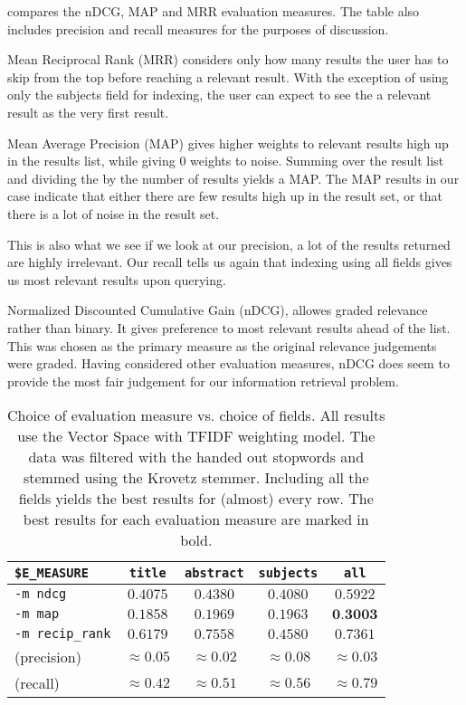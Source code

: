  compares the nDCG, MAP and MRR
evaluation measures.  The table also includes precision and recall measures for
the purposes of discussion.

Mean Reciprocal Rank (MRR) considers only how many results the user has to skip
from the top before reaching a relevant result. With the exception of using
only the subjects field for indexing, the user can expect to see the a relevant
result as the very first result.

Mean Average Precision (MAP) gives higher weights to relevant results high up
in the results list, while giving 0 weights to noise. Summing over the result
list and dividing the by the number of results yields a MAP. The MAP results in
our case indicate that either there are few results high up in the result set,
or that there is a lot of noise in the result set.

This is also what we see if we look at our precision, a lot of the results
returned are highly irrelevant. Our recall tells us again that indexing using
all fields gives us most relevant results upon querying.

Normalized Discounted Cumulative Gain (nDCG), allowes graded relevance rather
than binary. It gives preference to most relevant results ahead of the list.
This was chosen as the primary measure as the original relevance judgements
were graded. Having considered other evaluation measures, nDCG does seem to
provide the most fair judgement for our information retrieval problem.

\begin{table}[h!]
\centering
\begin{tabular}{lcccc}
\lstinline|$E_MEASURE| & \lstinline$title$ & \lstinline$abstract$ &
    \lstinline$subjects$ & \lstinline$all$ \\
\hline
\lstinline$-m ndcg$ & $0.4075$ & $0.4380$ & $0.4080$ & $\mathbf{0.5922}$ \\
\lstinline$-m map$ & $0.1858$ & $0.1969$ & $0.1963$ & $\textbf{0.3003}$ \\
\lstinline$-m recip_rank$ & $0.6179$ & $\mathbf{0.7558}$ & $0.4580$ & $0.7361$ \\
(precision) & $\approx 0.05$ & $\approx 0.02$ & $\mathbf{\approx 0.08}$ & $\approx 0.03$ \\
(recall) & $\approx 0.42$ & $\approx 0.51$ & $\approx 0.56$ & $\mathbf{\approx 0.79}$ \\
\hline
\end{tabular}
\caption[]{Choice of evaluation measure vs. choice of fields. All results use
the Vector Space with TFIDF weighting model. The data was filtered with the
handed out stopwords and stemmed using the Krovetz stemmer.  Including all the
fields yields the best results for (almost) every row. The best results for
each evaluation measure are marked in bold.}
\label{table:evaluation-measure-vs-fields}
\end{table}

